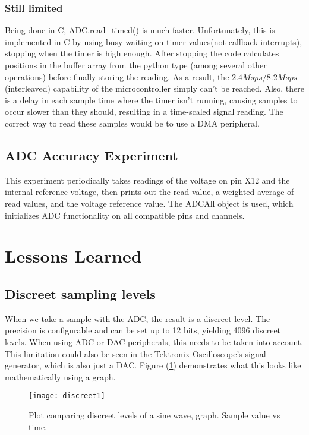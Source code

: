 \documentclass[11pt]{article}
\begin{document}
{	\subsubsection{Still limited} Being done in C, ADC.read\_timed() is much faster. Unfortunately, this is implemented in C by using busy-waiting on timer values(not callback interrupts), stopping when the timer is high enough. After stopping the code calculates positions in the buffer array from the python type (among several other operations) before finally storing the reading. As a result, the $2.4Msps/8.2Msps$(interleaved) capability of the microcontroller simply can't be reached. Also, there is a delay in each sample time where the timer isn't running, causing samples to occur slower than they should, resulting in a time-scaled signal reading. The correct way to read these samples would be to use a DMA peripheral.
	
	\subsection{ADC Accuracy Experiment}
	This experiment periodically takes readings of the voltage on pin X12 and the internal reference voltage, then prints out the read value, a weighted average of read values, and the voltage reference value. The ADCAll object is used, which initializes ADC functionality on all compatible pins and channels.
	
	\section{Lessons Learned}
	\subsection{Discreet sampling levels}
	When we take a sample with the ADC, the result is a discreet level. The precision is configurable and can be set up to 12 bits, yielding 4096 discreet levels. When using ADC or DAC peripherals, this needs to be taken into account. This limitation could also be seen in the Tektronix Oscilloscope's signal generator, which is also just a DAC. Figure (\ref{fig:discreet1}) demonstrates what this looks like mathematically using a graph.
	\begin{figure}[h]
		\centering
		\texttt{[image: discreet1]}
		\caption{Plot comparing discreet levels of a sine wave, graph. Sample value vs time.}
		\label{fig:discreet1}
		\vspace{25px}
	\end{figure}
	
}
\end{document}
